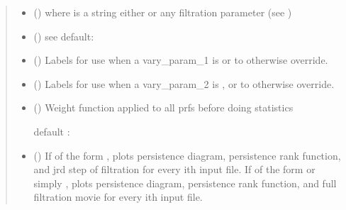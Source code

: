 \documentclass[letterpaper,10pt,openany,oneside,english]{sphinxmanual}
\begin{document}
\begin{fulllineitems}
\begin{quote}
\begin{description}
\begin{itemize}
\item {} 
 () \textendash{}  where  is a string \textendash{} either
 or any filtration parameter
(see )

\item {} 
 (\sphinxstyleliteralemphasis{, }) \textendash{} see 
default: 

\item {} 
 (\sphinxstyleliteralemphasis{, }) \textendash{} 
Labels for use when a vary\_param\_1 is  or to
otherwise override.



\item {} 
 (\sphinxstyleliteralemphasis{, }) \textendash{} 
Labels for use when a vary\_param\_2 is , or to
otherwise override.



\item {} 
 (\sphinxstyleliteralemphasis{, }) \textendash{} 
Weight function applied to all prfs before doing statistics

default : 


\item {} 
 (\sphinxstyleliteralemphasis{, }) \textendash{} 
If of the form , plots persistence
diagram, persistence rank function, and jrd step of filtration for
every ith input file. If of the form  or simply
, plots persistence diagram, persistence rank function, and full
filtration movie for every ith input file.


\end{itemize}
\end{description}
\end{quote}
\end{fulllineitems}
\end{document}
